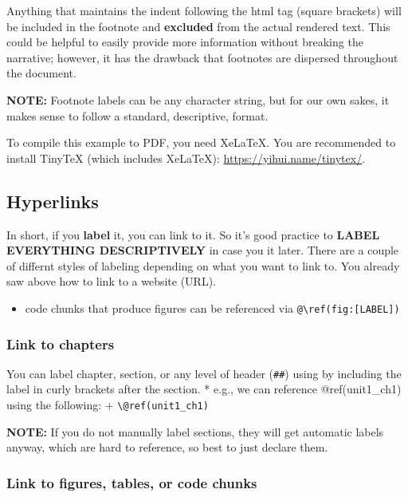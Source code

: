 \documentclass[
]{book}
\providecommand{\tightlist}{%
  \setlength{\itemsep}{0pt}\setlength{\parskip}{0pt}}
\begin{document}
Anything that maintains the indent following the html tag (square
brackets) will be included in the footnote and \textbf{excluded} from the
actual rendered text. This could be helpful to easily provide more
information without breaking the narrative; however, it has the drawback
that footnotes are dispersed throughout the document.

\textbf{NOTE:} Footnote labels can be any character string, but for our own
sakes, it makes sense to follow a standard, descriptive, format.

To compile this example to PDF, you need XeLaTeX. You are recommended to
install TinyTeX (which includes XeLaTeX): \url{https://yihui.name/tinytex/}.

\hypertarget{hyperlinks}{%
\subsection{Hyperlinks}\label{hyperlinks}}

In short, if you \textbf{label} it, you can link to it. So it's good practice to
\textbf{LABEL EVERYTHING DESCRIPTIVELY} in case you it later. There are a couple of differnt styles of labeling depending on what you want to link to. You already saw above how to link to a website (URL).

\begin{itemize}
\tightlist
\item
  code chunks that produce figures can be referenced via \texttt{@\textbackslash{}ref(fig:{[}LABEL{]})}
\end{itemize}

\hypertarget{link-to-chapters}{%
\subsubsection{Link to chapters}\label{link-to-chapters}}

You can label chapter, section, or any level of header (\texttt{\#\#}) using by including the label in curly brackets after the section.
* e.g., we can reference @ref(unit1\_ch1) using the following:
+ \texttt{\textbackslash{}@ref(unit1\_ch1)}

\textbf{NOTE:} If you do not manually label sections, they will get automatic labels anyway, which are hard to reference, so best to just declare them.

\hypertarget{link-to-figures-tables-or-code-chunks}{%
\subsubsection{Link to figures, tables, or code chunks}\label{link-to-figures-tables-or-code-chunks}}
\end{document}
